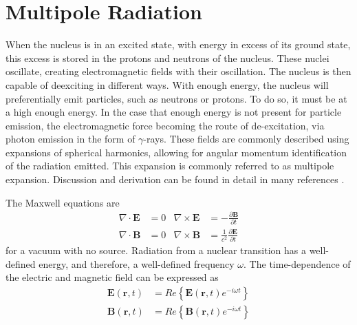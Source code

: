 \section{Multipole Radiation}
\label{sec:multipole}
When the nucleus is in an excited state, with energy in excess of its ground state, this excess is stored in the protons and neutrons of the nucleus. These nuclei oscillate, creating electromagnetic fields with their oscillation. The nucleus is then capable of deexciting in different ways. With enough energy, the nucleus will preferentially emit particles, such as neutrons or protons. To do so, it must be at a high enough energy. In the case that enough energy is not present for particle emission, the electromagnetic force becoming the route of de-excitation, via photon emission in the form of $\gamma$-rays. These fields are commonly described using expansions of spherical harmonics, allowing for angular momentum identification of the radiation emitted. This expansion is commonly referred to as multipole expansion. Discussion and derivation can be found in detail in many references \citep{blatt79:_emradiation, jackson99:_emradiation, zangwill13:_emradiation}.

The Maxwell equations are
\begin{subequations}
\label{eq:maxwell_free}
\begin{align}
    \nabla \cdot \textbf{E} & = 0 &   \nabla \times \textbf{E} & = -\frac{\partial \textbf{B}}{\partial t} \\
     \nabla \cdot \textbf{B} & = 0 &  \nabla \times \textbf{B} & = \frac{1}{c^2}\frac{\partial \textbf{E}}{\partial t}
\end{align}
\end{subequations}
for a vacuum with no source. Radiation from a nuclear transition has a well-defined energy, and therefore, a well-defined frequency $\omega$. The time-dependence of the electric and magnetic field can be expressed as
\begin{subequations}
\label{eq:maxwell_rad}
\begin{align}
    \textbf{E}(\textbf{r},t) & = Re\left\{\textbf{E}(\textbf{r},t)e^{-i\omega t}\right\} \\
    \textbf{B}(\textbf{r},t) & = Re\left\{\textbf{B}(\textbf{r},t)e^{-i\omega t}\right\}
\end{align}
\end{subequations}
 
